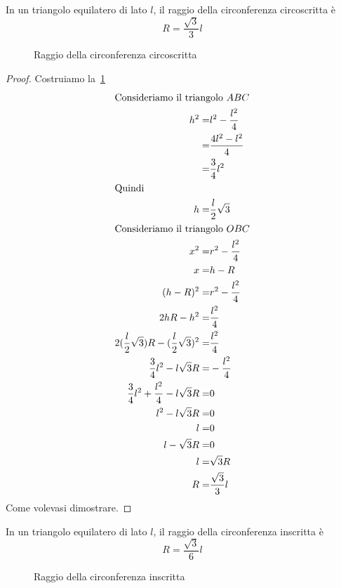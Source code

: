 \begin{thm}\label{thm:raggiocirconferenzacircoscritta}
	In un triangolo equilatero di lato $l$, il raggio della circonferenza circoscritta è \[R=\dfrac{\sqrt{3}}{3}l\]
\end{thm}
\begin{figure}
	\centering
	
	\caption{Raggio della circonferenza circoscritta}
	\label{fig:raggiocirconferenzacircoscritta}
\end{figure}
\begin{proof}
	Costruiamo la~\cref{fig:raggiocirconferenzacircoscritta}
	\begin{align*}
		\intertext{Consideriamo il triangolo $ABC$}
		h^2=&l^2-\dfrac{l^2}{4}\\
		=&\dfrac{4l^2-l^2}{4}\\
		=&\dfrac{3}{4}l^2\\
		\intertext{Quindi}
		h=&\dfrac{l}{2}\sqrt{3}\\
		\intertext{Consideriamo il triangolo $OBC$}
		x^2=&r^2-\dfrac{l^2}{4}\\
		x=&h-R\\
		(h-R)^2=&r^2-\dfrac{l^2}{4}\\
		2hR-h^2=&\dfrac{l^2}{4}\\
		2(\dfrac{l}{2}\sqrt{3})R-(\dfrac{l}{2}\sqrt{3})^2=&\dfrac{l^2}{4}\\
		\dfrac{3}{4}l^2-l\sqrt{3}R=&-\dfrac{l^2}{4}\\
		\dfrac{3}{4}l^2+\dfrac{l^2}{4}-l\sqrt{3}R=&0\\
		l^2-l\sqrt{3}R=&0\\
		l=&0\\
		l-\sqrt{3}R=&0\\
		l=&\sqrt{3}R\\
		R=&\dfrac{\sqrt{3}}{3}l
	\end{align*}
	Come volevasi dimostrare.
\end{proof}
\begin{thm}\label{thm:raggiocirconferenzainscritta}
	In un triangolo equilatero di lato $l$, il raggio della circonferenza inscritta è \[R=\dfrac{\sqrt{3}}{6}l\]
\end{thm}
\begin{figure}
	\centering
	
	\caption{Raggio della circonferenza inscritta}
	\label{fig:raggiocirconferenzainscritta}
\end{figure}
